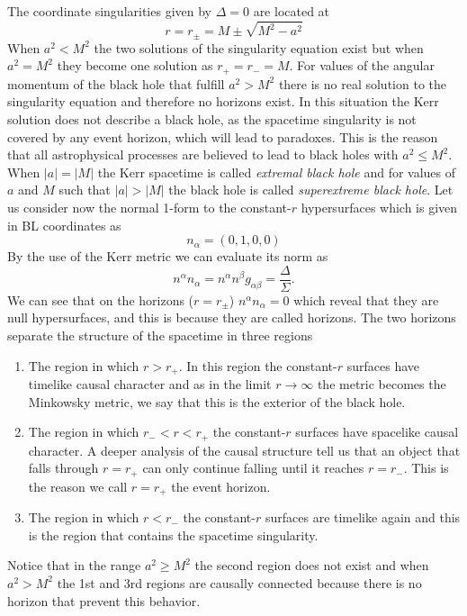 The coordinate singularities given by $\Delta=0$ are located at
\begin{equation}
 r=r_\pm=M \pm \sqrt{M^2-a^2}
\end{equation}
When $a^2<M^2$ the two solutions of the singularity equation exist but when $a^2=M^2$ they become one solution as $r_+=r_-=M$. For values of the angular momentum of the black hole that fulfill $a^2>M^2$ there is no real solution to the singularity equation and therefore no horizons exist. In this situation the Kerr solution does not describe a black hole, as the spacetime singularity is not covered by any event horizon, which will lead to paradoxes. This is the reason that all astrophysical processes are believed to lead to black holes with $a^2 \leq M^2$. When $|a|=|M|$ the Kerr spacetime is called \textit{extremal black hole} and for values of $a$ and $M$ such that $|a|>|M|$ the black hole is called \textit{superextreme black hole}. Let us consider now the normal 1-form to the constant-$r$ hypersurfaces which is given in  \gls{BL} coordinates as
\begin{equation}
 n_\alpha=(0,1,0,0)
\end{equation}
By the use of the Kerr metric we can evaluate its norm as
\begin{equation}
 n^\alpha n_\alpha= n^\alpha n^\beta g_{\alpha \beta} = \frac{\Delta}{\Sigma}.
\end{equation}
We can see that on the horizons ($r=r_\pm$) $n^\alpha n_\alpha=0$ which reveal that they are null hypersurfaces, and this is because they are called horizons. The two horizons separate the structure of the spacetime in three regions
\begin{enumerate}
 \item The region in which $r>r_+$. In this region the constant-$r$ surfaces have timelike causal character and as in the limit $r \to \infty$ the metric becomes the Minkowsky metric, we say that this is the exterior of the black hole.
 \item The region in which $r_-<r<r_+$ the constant-$r$ surfaces have spacelike causal character. A deeper analysis of the causal structure tell us that an object that falls through $r=r_+$ can only continue falling until it reaches $r=r_-$. This is the reason we call $r=r_+$ the event horizon.
 \item The region in which $r<r_-$ the constant-$r$ surfaces are timelike again and this is the region that contains the spacetime singularity.
\end{enumerate}
Notice that in the range $a^2 \geq M^2$ the second region does not exist and when $a^2>M^2$ the 1st and 3rd regions are causally connected because there is no horizon that prevent this behavior.

